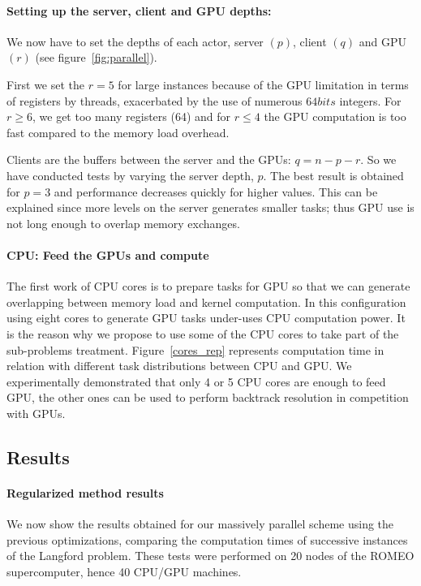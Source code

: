 \paragraph{Setting up the server, client and GPU depths: }
We now have to set the depths of each actor, server $(p)$, client $(q)$ and GPU $(r)$ (see figure~\ref{fig:parallel}).

First we set the $r = 5$ for large instances because of the GPU limitation in terms of registers by threads, exacerbated by the use of numerous $64bits$ integers. For $r \geq 6$, we get too many registers (64) and for $r \leq 4$ the GPU computation is too fast compared to the memory load overhead.

Clients are the buffers between the server and the GPUs: 
$q = n - p- r$.
So we have conducted tests by varying the server depth, $p$. The best result is obtained for $p=3$ and performance decreases quickly for higher values. This can be explained since more levels on the server generates smaller tasks; thus GPU use is not long enough to overlap memory exchanges.

\paragraph{CPU: Feed the GPUs and compute}
The first work of CPU cores is to prepare tasks for GPU so that we can generate overlapping between memory load and kernel computation. 
In this configuration using eight cores to generate GPU tasks under-uses CPU computation power. 
It is the reason why we propose to use some of the CPU cores to take part of the sub-problems treatment. 
Figure~\ref{cores_rep} represents computation time in relation with different task distributions between CPU and GPU.
We experimentally demonstrated that only 4 or 5 CPU cores are enough to feed GPU, the other ones can be used to perform backtrack resolution in competition with GPUs.

\subsection{Results}

\paragraph{Regularized method results}
We now show the results obtained for our massively parallel scheme using the previous optimizations, comparing the computation times of successive instances of the Langford problem. 
These tests were performed on 20 nodes of the ROMEO supercomputer, hence 40 CPU/GPU machines.

